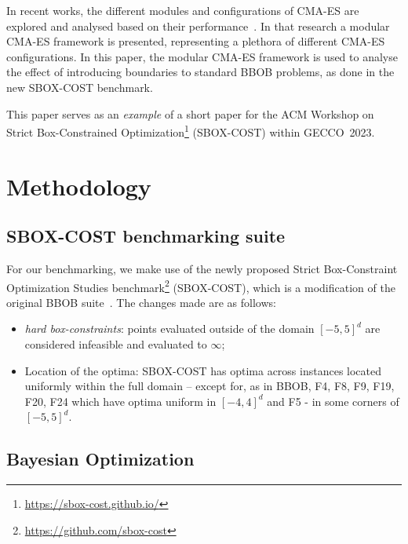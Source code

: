 \documentclass[sigconf=true, nonacm=false, review=true, anonymous = false,screen=true]{acmart}
\begin{document}
In recent works, the different modules and configurations of CMA-ES are explored and analysed based on their performance~\cite{de2021tuning}. In that research a modular CMA-ES framework is presented, representing a plethora of different CMA-ES configurations. In this paper, the modular CMA-ES framework is used to analyse the effect of introducing boundaries to standard BBOB problems, as done in the new SBOX-COST benchmark. 

This paper serves as an \textit{example} of a short paper for the ACM Workshop on Strict Box-Constrained Optimization\footnote{\url{https://sbox-cost.github.io/}} (SBOX-COST) within GECCO~2023.

\section{Methodology}
\subsection{SBOX-COST benchmarking suite}

For our benchmarking, we make use of the newly proposed Strict Box-Constraint Optimization Studies benchmark\footnote{\url{https://github.com/sbox-cost}} (SBOX-COST), which is a modification of the original BBOB suite~\cite{hansen2020coco}. The changes made are as follows: 
\begin{itemize}
    \item \textit{hard box-constraints}: points evaluated outside of the domain $[-5,5]^d$ are considered infeasible and evaluated to $\infty$;
    \item Location of the optima: SBOX-COST has optima across instances located uniformly within the full domain -- except for, as in BBOB, F4, F8, F9, F19, F20, F24 which have optima uniform in $[-4,4]^d$ and F5 - in some corners of $[-5,5]^d$.
\end{itemize} 

\subsection{Bayesian Optimization}
\end{document}
